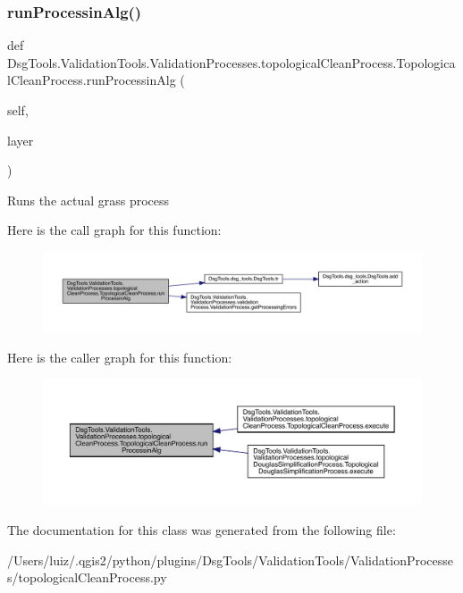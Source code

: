 \subsubsection{\texorpdfstring{run\+Processin\+Alg()}{runProcessinAlg()}}
{\footnotesize\ttfamily def Dsg\+Tools.\+Validation\+Tools.\+Validation\+Processes.\+topological\+Clean\+Process.\+Topological\+Clean\+Process.\+run\+Processin\+Alg (\begin{DoxyParamCaption}\item[{}]{self,  }\item[{}]{layer }\end{DoxyParamCaption})}

\begin{DoxyVerb}Runs the actual grass process
\end{DoxyVerb}
 Here is the call graph for this function\+:
\nopagebreak
\begin{figure}[H]
\begin{center}
\leavevmode
\includegraphics[width=350pt]{class_dsg_tools_1_1_validation_tools_1_1_validation_processes_1_1topological_clean_process_1_1_topological_clean_process_a7110c9d82f6a826525c0478fdf9fc359_cgraph}
\end{center}
\end{figure}
Here is the caller graph for this function\+:
\nopagebreak
\begin{figure}[H]
\begin{center}
\leavevmode
\includegraphics[width=350pt]{class_dsg_tools_1_1_validation_tools_1_1_validation_processes_1_1topological_clean_process_1_1_topological_clean_process_a7110c9d82f6a826525c0478fdf9fc359_icgraph}
\end{center}
\end{figure}


The documentation for this class was generated from the following file\+:\begin{DoxyCompactItemize}
\item 
/\+Users/luiz/.\+qgis2/python/plugins/\+Dsg\+Tools/\+Validation\+Tools/\+Validation\+Processes/topological\+Clean\+Process.\+py\end{DoxyCompactItemize}
